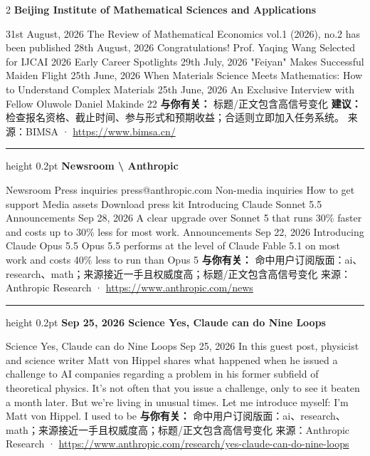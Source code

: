 \documentclass[10.5pt]{ctexart}
\begin{document}
\begin{multicols}{2}
{\large\bfseries Beijing Institute of Mathematical Sciences and Applications}\par
31st August, 2026 The Review of Mathematical Economics vol.1 (2026), no.2 has been published 28th August, 2026 Congratulations! Prof. Yaqing Wang Selected for IJCAI 2026 Early Career Spotlights 29th July, 2026 "Feiyan" Makes Successful Maiden Flight 25th June, 2026 When Materials Science Meets Mathematics: How to Understand Complex Materials 25th June, 2026 An Exclusive Interview with Fellow Oluwole Daniel Makinde 22
\textbf{与你有关：} 标题/正文包含高信号变化
\textbf{建议：} 检查报名资格、截止时间、参与形式和预期收益；合适则立即加入任务系统。
{\footnotesize\color{ormuted} 来源：BIMSA · \url{https://www.bimsa.cn/}}
\vspace{2mm}
\hrule height 0.2pt
\vspace{2mm}
{\large\bfseries Newsroom \textbackslash{} Anthropic}\par
Newsroom Press inquiries press@anthropic.com Non-media inquiries How to get support Media assets Download press kit Introducing Claude Sonnet 5.5 Announcements Sep 28, 2026 A clear upgrade over Sonnet 5 that runs 30\% faster and costs up to 30\% less for most work. Announcements Sep 22, 2026 Introducing Claude Opus 5.5 Opus 5.5 performs at the level of Claude Fable 5.1 on most work and costs 40\% less to run than Opus 5
\textbf{与你有关：} 命中用户订阅版面：ai、research、math；来源接近一手且权威度高；标题/正文包含高信号变化
{\footnotesize\color{ormuted} 来源：Anthropic Research · \url{https://www.anthropic.com/news}}
\vspace{2mm}
\hrule height 0.2pt
\vspace{2mm}
{\large\bfseries Sep 25, 2026 Science Yes, Claude can do Nine Loops}\par
Science Yes, Claude can do Nine Loops Sep 25, 2026 In this guest post, physicist and science writer Matt von Hippel shares what happened when he issued a challenge to AI companies regarding a problem in his former subfield of theoretical physics. It’s not often that you issue a challenge, only to see it beaten a month later. But we’re living in unusual times. Let me introduce myself: I’m Matt von Hippel. I used to be
\textbf{与你有关：} 命中用户订阅版面：ai、research、math；来源接近一手且权威度高；标题/正文包含高信号变化
{\footnotesize\color{ormuted} 来源：Anthropic Research · \url{https://www.anthropic.com/research/yes-claude-can-do-nine-loops}}
\vspace{2mm}

\end{multicols}
\end{document}

